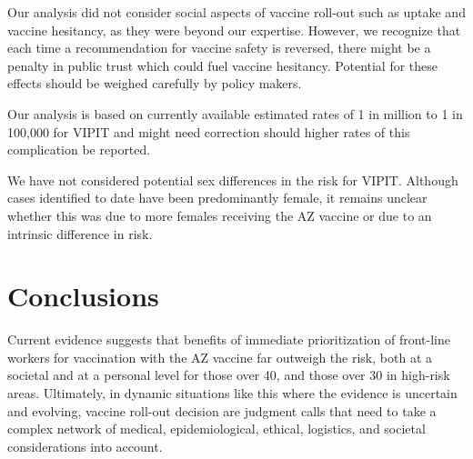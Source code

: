 \documentclass[]{interact}
\theoremstyle{plain}%
\theoremstyle{definition}
\theoremstyle{remark}
\begin{document}
Our analysis did not consider social aspects of vaccine roll-out such as
uptake and vaccine hesitancy, as they were beyond our expertise.
However, we recognize that each time a recommendation for vaccine safety
is reversed, there might be a penalty in public trust which could fuel
vaccine hesitancy. Potential for these effects should be weighed
carefully by policy makers.

Our analysis is based on currently available estimated rates of 1 in
million to 1 in 100,000 for VIPIT and might need correction should
higher rates of this complication be reported.

We have not considered potential sex differences in the risk for VIPIT.
Although cases identified to date have been predominantly female, it
remains unclear whether this was due to more females receiving the AZ
vaccine or due to an intrinsic difference in risk.

\hypertarget{conclusions}{%
\section{Conclusions}\label{conclusions}}

Current evidence suggests that benefits of immediate prioritization of
front-line workers for vaccination with the AZ vaccine far outweigh the
risk, both at a societal and at a personal level for those over 40, and
those over 30 in high-risk areas. Ultimately, in dynamic situations like
this where the evidence is uncertain and evolving, vaccine roll-out
decision are judgment calls that need to take a complex network of
medical, epidemiological, ethical, logistics, and societal
considerations into account.



\end{document}
